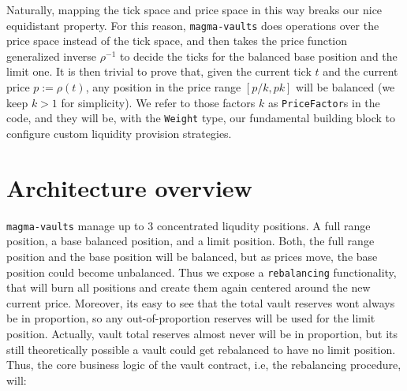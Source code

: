\documentclass[11pt]{article}
\begin{document}
Naturally, mapping the tick space and price space in this way breaks our nice
equidistant property. For this reason, \texttt{magma-vaults} does operations over
the price space instead of the tick space, and then takes the price function
generalized inverse $\rho^{-1}$ to decide the ticks for the balanced base position and the
limit one. It is then trivial to prove that, given the current tick $t$ and the
current price $p := \rho(t)$, any position in the price range $[p/k, pk]$ will
be balanced (we keep $k > 1$ for simplicity). We refer to those factors $k$ as
\texttt{PriceFactor}s in the code, and they will be, with the
\texttt{Weight} type, our fundamental building block to configure custom
liquidity provision strategies.

\section{Architecture overview}
\texttt{magma-vaults} manage up to 3 concentrated liqudity positions. A full range
position, a base balanced position, and a limit position. Both, the full range
position and the base position will be balanced, but as prices move, the base
position could become unbalanced. Thus we expose a \texttt{rebalancing}
functionality, that will burn all positions and create them again centered
around the new current price. Moreover, its easy to see that the total vault reserves
wont always be in proportion, so any out-of-proportion reserves will be used
for the limit position. Actually, vault total reserves almost never will be in
proportion, but its still theoretically possible a vault could get rebalanced
to have no limit position. Thus, the core business logic of the vault contract,
i.e, the rebalancing procedure, will:
\end{document}
